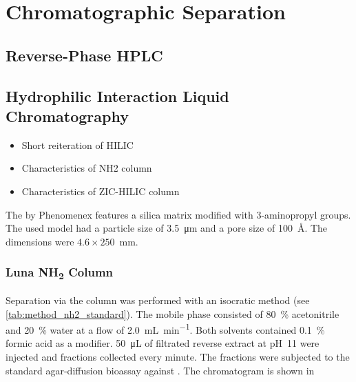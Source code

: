 
\section{Chromatographic Separation} %
\label{sec:results_chromatographic_separation}

    \subsection{Reverse-Phase HPLC} %
    \label{sub:results_reverse_phase_hplc}


    \subsection{Hydrophilic Interaction Liquid Chromatography} %
    \label{sub:results_hydrophilic_interaction_chromatography}
    
	\begin{itemize}
		\item Short reiteration of HILIC
		\item Characteristics of NH2 column
		\item Characteristics of ZIC-HILIC column
	\end{itemize}

	The \luna by Phenomenex features a silica matrix modified with 3-aminopropyl groups.
	The used model had a particle size of \SI{3.5}{\micro\meter} and a pore size of 100~\AA.
	The dimensions were $4.6\times250$~mm.
    
	    \subsubsection{Luna NH\textsubscript{2} Column}
	    
	    Separation via the \luna column was performed with an isocratic method (see \ref{tab:method_nh2_standard}).
	    The mobile phase consisted of 80~\% acetonitrile and 20~\% water at a flow of \SI{2.0}{\milli\liter\per\minute}.
	    Both solvents contained 0.1~\% formic acid as a modifier.
	    \SI{50}{\micro\liter} of filtrated reverse extract at pH~11 were injected and fractions collected every minute.
	    The fractions were subjected to the standard agar-diffusion bioassay against \coli.
	    The chromatogram is shown in 
	    
	    
